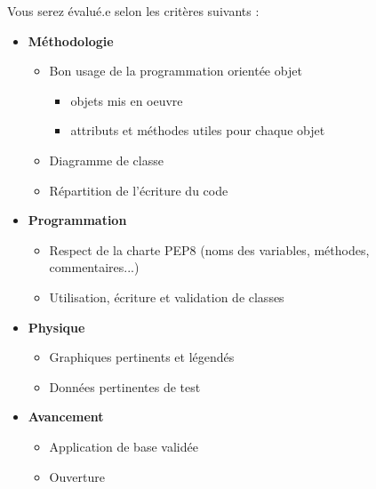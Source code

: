 \documentclass[10pt]{article} %
\begin{document}
\bigskip

\bigskip

\begin{mdframed}[style=intextbox,frametitle={Critères d'évaluation}] %

Vous serez évalué.e selon les critères suivants :

\begin{itemize}
	\item \textbf{\large Méthodologie}
	\begin{itemize}
		\item Bon usage de la programmation orientée objet
		\begin{itemize}
			\item objets mis en oeuvre
			\item attributs et méthodes utiles pour chaque objet
		\end{itemize}
		\item Diagramme de classe
		\item Répartition de l'écriture du code
	\end{itemize}

	\item \textbf{\large Programmation}
	\begin{itemize}
		\item Respect de la charte PEP8 (noms des variables, méthodes, commentaires...)
		\item Utilisation, écriture et validation de classes
	\end{itemize}

	\item \textbf{\large Physique}
	\begin{itemize}
		\item Graphiques pertinents et légendés
		\item Données pertinentes de test
	\end{itemize}

	\item \textbf{\large Avancement}
	\begin{itemize}
		\item Application de base validée
		\item Ouverture
	\end{itemize}

\end{itemize}

\end{mdframed}
\end{document}

